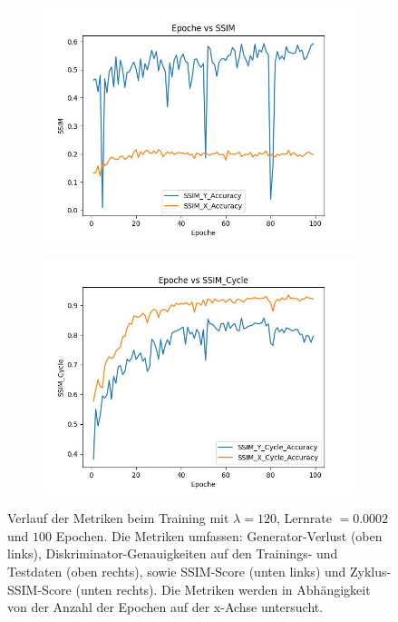 \begin{figure}[H]
\begin{subfigure}[t]{.45\textwidth}
    \includegraphics[width=\linewidth]{images/cycleGanResults/SSIM.jpg}
  \end{subfigure}
  \hfill
  \begin{subfigure}[t]{.45\textwidth}
    \centering
    \includegraphics[width=\linewidth]{images/cycleGanResults/SSIM_Cycle.jpg}
  \end{subfigure}

  \caption{Verlauf der Metriken beim Training mit $\lambda=120$, Lernrate $=0.0002$ und $100$ Epochen. Die Metriken umfassen: Generator-Verlust (oben links), Diskriminator-Genauigkeiten auf den Trainings- und Testdaten (oben rechts), sowie SSIM-Score (unten links) und Zyklus-SSIM-Score (unten rechts).
  Die Metriken werden in Abhängigkeit von der Anzahl der Epochen auf der x-Achse untersucht.}
  \label{evaluation:cycleGan_Metriken}
\end{figure}

